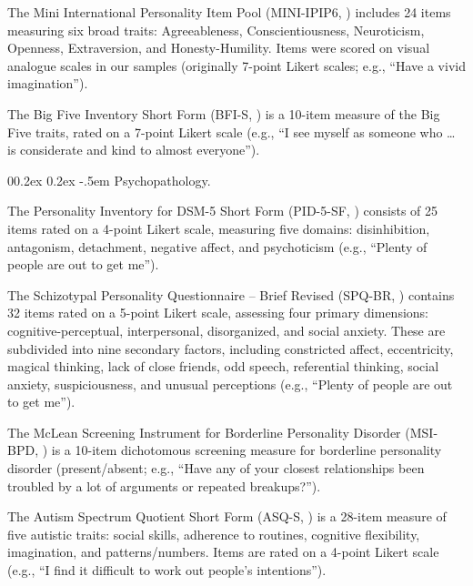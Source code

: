 \documentclass[
  jou,
  floatsintext,
  longtable,
  nolmodern,
  notxfonts,
  notimes,
  colorlinks=true,linkcolor=blue,citecolor=blue,urlcolor=blue]{apa7}
\makeatletter
\renewcommand{\paragraph}{\@startsection{paragraph}{4}{\parindent}%
	{0\baselineskip \@plus 0.2ex \@minus 0.2ex}%
	{-.5em}%
	{\normalfont\normalsize\bfseries\typesectitle}}
\makeatother
\begin{document}
The Mini International Personality Item Pool (MINI-IPIP6,
) includes 24 items
measuring six broad traits: Agreeableness, Conscientiousness,
Neuroticism, Openness, Extraversion, and Honesty-Humility. Items were
scored on visual analogue scales in our samples (originally 7-point
Likert scales; e.g., ``Have a vivid imagination'').

The Big Five Inventory Short Form (BFI-S,
) is a
10-item measure of the Big Five traits, rated on a 7-point Likert scale
(e.g., ``I see myself as someone who \ldots{} is considerate and kind to
almost everyone'').

\paragraph{Psychopathology.}\label{psychopathology}

The Personality Inventory for DSM-5 Short Form (PID-5-SF,
) consists of 25
items rated on a 4-point Likert scale, measuring five domains:
disinhibition, antagonism, detachment, negative affect, and psychoticism
(e.g., ``Plenty of people are out to get me'').

The Schizotypal Personality Questionnaire -- Brief Revised (SPQ-BR,
) contains
32 items rated on a 5-point Likert scale, assessing four primary
dimensions: cognitive-perceptual, interpersonal, disorganized, and
social anxiety. These are subdivided into nine secondary factors,
including constricted affect, eccentricity, magical thinking, lack of
close friends, odd speech, referential thinking, social anxiety,
suspiciousness, and unusual perceptions (e.g., ``Plenty of people are
out to get me'').

The McLean Screening Instrument for Borderline Personality Disorder
(MSI-BPD, ) is a
10-item dichotomous screening measure for borderline personality
disorder (present/absent; e.g., ``Have any of your closest relationships
been troubled by a lot of arguments or repeated breakups?'').

The Autism Spectrum Quotient Short Form (ASQ-S,
) is a
28-item measure of five autistic traits: social skills, adherence to
routines, cognitive flexibility, imagination, and patterns/numbers.
Items are rated on a 4-point Likert scale (e.g., ``I find it difficult
to work out people's intentions'').
\end{document}
